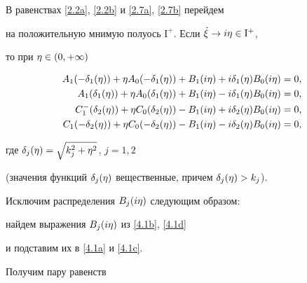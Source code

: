 В равенствах \eqref{2.2a}, \eqref{2.2b} и \eqref{2.7a}, \eqref{2.7b} перейдем


на положительную мнимую полуось $\mathrm I^+$. Если $\Dot{\xi}\to i\eta\in \mathrm I^+$,


то при $\eta\in(0,+\infty)$


\begin{align}


\label{4.1a}


A_1(-\defet)+\et A_0(-\defet)+B_1(i\et)+i\defet B_0(i\et) &= 0 ,\\


%


\label{4.1b}


A_1(\defet)+\et A_0(\defet)+B_1(i\et)-i\defet B_0(i\et) &= 0 , \\


%


\label{4.1c}


C_1^-(\deset)+\et C_0(\deset)-B_1(i\et)+i\deset B_0(i\et) &= 0 ,\\


%


\label{4.1d}


C_1(-\deset)+\et C_0(-\deset)-B_1(i\et)-i\deset B_0(i\et) &= 0 ,


\end{align}


где $\delta_j(\eta)=\sqrt{k^2_j+\eta^2}$, $j=1,2$


(значения функций $\delta_j(\eta)$ вещественные, причем $\delta_j(\eta)>k_j$).





Исключим распределения $B_j(i\eta)$ следующим образом:


найдем выражения $B_j(i\eta)$ из \eqref{4.1b}, \eqref{4.1d}


и подставим их в \eqref{4.1a} и \eqref{4.1c}.


Получим пару равенств


